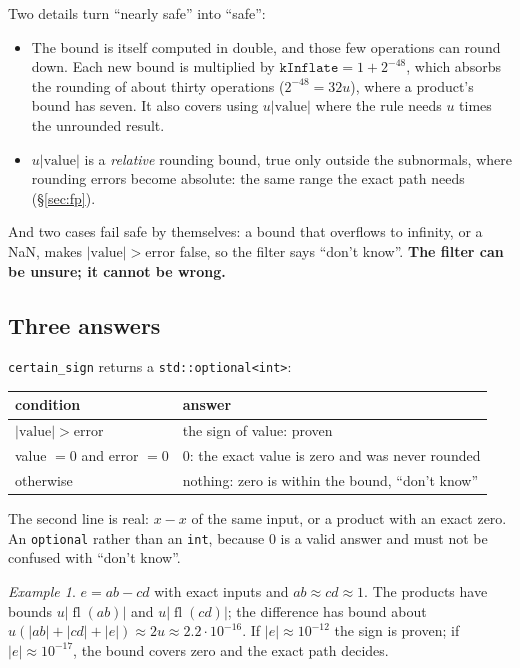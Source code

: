 \documentclass[11pt,a4paper]{article}
\newcommand{\code}[1]{\texttt{#1}}
\newcommand{\fl}{\operatorname{fl}}
\newcommand{\secref}[1]{\S\ref{#1}}
\theoremstyle{definition}
\theoremstyle{remark}
\newtheorem*{example}{Example}
\begin{document}
Two details turn ``nearly safe'' into ``safe'':
\begin{itemize}
  \item The bound is itself computed in double, and those few operations can round down. Each new
    bound is multiplied by $\code{kInflate} = 1 + 2^{-48}$, which absorbs the rounding of about
    thirty operations ($2^{-48} = 32u$), where a product's bound has seven. It also covers using
    $u|\text{value}|$ where the rule needs $u$ times the unrounded result.
  \item $u|\text{value}|$ is a \emph{relative} rounding bound, true only outside the subnormals,
    where rounding errors become absolute: the same range the exact path needs (\secref{sec:fp}).
\end{itemize}
And two cases fail safe by themselves: a bound that overflows to infinity, or a NaN, makes
$|\text{value}| > \text{error}$ false, so the filter says ``don't know''. \textbf{The filter can be
unsure; it cannot be wrong.}

\subsection{Three answers}

\code{certain\_sign} returns a \code{std::optional<int>}:
\begin{center}
\begin{tabular}{@{}ll@{}}
  \toprule
  condition & answer \\
  \midrule
  $|\text{value}| > \text{error}$ & the sign of value: proven \\
  value $= 0$ and error $= 0$ & 0: the exact value is zero and was never rounded \\
  otherwise & nothing: zero is within the bound, ``don't know'' \\
  \bottomrule
\end{tabular}
\end{center}
The second line is real: $x - x$ of the same input, or a product with an exact zero. An
\code{optional} rather than an \code{int}, because 0 is a valid answer and must not be confused
with ``don't know''.

\begin{example}
$e = ab - cd$ with exact inputs and $ab \approx cd \approx 1$. The products have bounds
$u|\fl(ab)|$ and $u|\fl(cd)|$; the difference has bound about $u(|ab| + |cd| + |e|) \approx
2u \approx 2.2\cdot10^{-16}$. If $|e| \approx 10^{-12}$ the sign is proven; if
$|e| \approx 10^{-17}$, the bound covers zero and the exact path decides.
\end{example}
\end{document}
